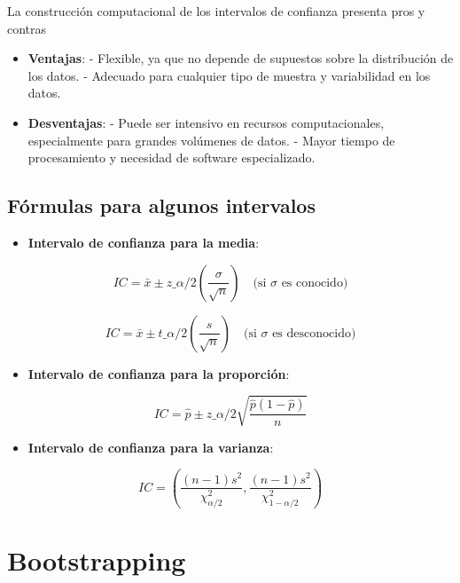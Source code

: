 \documentclass[
  letterpaper,
  DIV=11,
  numbers=noendperiod]{scrreprt}
\providecommand{\tightlist}{%
  \setlength{\itemsep}{0pt}\setlength{\parskip}{0pt}}\usepackage{longtable,booktabs,array}
\begin{document}
La construcción computacional de los intervalos de confianza presenta
pros y contras

\begin{itemize}
\item
  \textbf{Ventajas}: - Flexible, ya que no depende de supuestos sobre la
  distribución de los datos. - Adecuado para cualquier tipo de muestra y
  variabilidad en los datos.
\item
  \textbf{Desventajas}: - Puede ser intensivo en recursos
  computacionales, especialmente para grandes volúmenes de datos. -
  Mayor tiempo de procesamiento y necesidad de software especializado.
\end{itemize}

\section{Fórmulas para algunos
intervalos}\label{fuxf3rmulas-para-algunos-intervalos}

\begin{itemize}
\tightlist
\item
  \textbf{Intervalo de confianza para la media}:
\end{itemize}

\[IC = \bar{x} \pm z\_{\alpha/2} \left(\frac{\sigma}{\sqrt{n}}\right) \quad \text{(si } \sigma \text{ es conocido)}\]

\[IC = \bar{x} \pm t\_{\alpha/2} \left(\frac{s}{\sqrt{n}}\right) \quad \text{(si } \sigma \text{ es desconocido)}\]

\begin{itemize}
\tightlist
\item
  \textbf{Intervalo de confianza para la proporción}:
\end{itemize}

\[IC = \hat{p} \pm z\_{\alpha/2} \sqrt{\frac{\hat{p}(1 - \hat{p})}{n}}\]

\begin{itemize}
\tightlist
\item
  \textbf{Intervalo de confianza para la varianza}:
\end{itemize}

\[ IC = \left(\frac{(n-1)s^2}{\chi^2_{\alpha/2}}, \frac{(n-1)s^2}{\chi^2_{1-\alpha/2}}\right) \]

\chapter{Bootstrapping}\label{bootstrapping}
\end{document}
